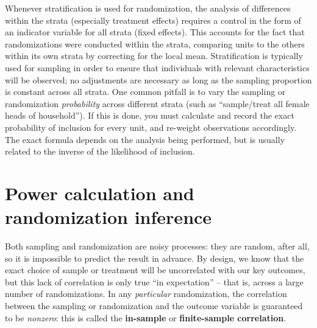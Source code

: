 
Whenever stratification is used for randomization,
the analysis of differences within the strata (especially treatment effects)
requires a control in the form of an indicator variable for all strata (fixed effects).
This accounts for the fact that randomizations were conducted within the strata,
comparing units to the others within its own strata by correcting for the local mean.
Stratification is typically used for sampling
in order to ensure that individuals with relevant characteristics will be observed;
no adjustments are necessary as long as the sampling proportion is constant across all strata.
One common pitfall is to vary the sampling or randomization \textit{probability}
across different strata (such as ``sample/treat all female heads of household'').
If this is done, you must calculate and record the exact probability
of inclusion for every unit, and re-weight observations accordingly.
The exact formula depends on the analysis being performed,
but is usually related to the inverse of the likelihood of inclusion.


\section{Power calculation and randomization inference}

Both sampling and randomization are noisy processes:
they are random, after all, so it is impossible to predict the result in advance.
By design, we know that the exact choice of sample or treatment
will be uncorrelated with our key outcomes,
but this lack of correlation is only true ``in expectation'' --
that is, across a large number of randomizations.
In any \textit{particular} randomization,
the correlation between the sampling or randomization and the outcome variable
is guaranteed to be \textit{nonzero}:
this is called the \textbf{in-sample} or \textbf{finite-sample correlation}.

